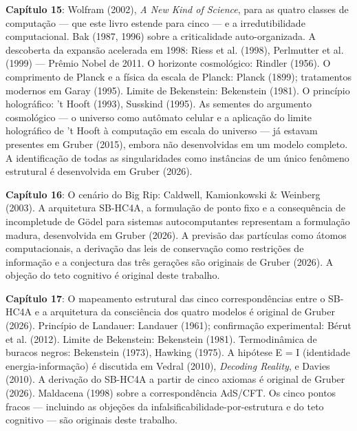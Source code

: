 \documentclass[11pt, twoside, openright]{book}
\begin{document}
\textbf{Capítulo 15}: Wolfram (2002), \textit{A New Kind of Science}, para as quatro classes de computação --- que este livro estende para cinco --- e a irredutibilidade computacional. Bak (1987, 1996) sobre a criticalidade auto-organizada. A descoberta da expansão acelerada em 1998: Riess et al. (1998), Perlmutter et al. (1999) --- Prêmio Nobel de 2011. O horizonte cosmológico: Rindler (1956). O comprimento de Planck e a física da escala de Planck: Planck (1899); tratamentos modernos em Garay (1995). Limite de Bekenstein: Bekenstein (1981). O princípio holográfico: 't Hooft (1993), Susskind (1995). As sementes do argumento cosmológico --- o universo como autômato celular e a aplicação do limite holográfico de 't Hooft à computação em escala do universo --- já estavam presentes em Gruber (2015), embora não desenvolvidas em um modelo completo. A identificação de todas as singularidades como instâncias de um único fenômeno estrutural é desenvolvida em Gruber (2026).

\textbf{Capítulo 16}: O cenário do Big Rip: Caldwell, Kamionkowski \& Weinberg (2003). A arquitetura SB-HC4A, a formulação de ponto fixo e a consequência de incompletude de Gödel para sistemas autocomputantes representam a formulação madura, desenvolvida em Gruber (2026). A previsão das partículas como átomos computacionais, a derivação das leis de conservação como restrições de informação e a conjectura das três gerações são originais de Gruber (2026). A objeção do teto cognitivo é original deste trabalho.

\textbf{Capítulo 17}: O mapeamento estrutural das cinco correspondências entre o SB-HC4A e a arquitetura da consciência dos quatro modelos é original de Gruber (2026). Princípio de Landauer: Landauer (1961); confirmação experimental: Bérut et al. (2012). Limite de Bekenstein: Bekenstein (1981). Termodinâmica de buracos negros: Bekenstein (1973), Hawking (1975). A hipótese E = I (identidade energia-informação) é discutida em Vedral (2010), \textit{Decoding Reality}, e Davies (2010). A derivação do SB-HC4A a partir de cinco axiomas é original de Gruber (2026). Maldacena (1998) sobre a correspondência AdS/\allowbreak{}CFT. Os cinco pontos fracos --- incluindo as objeções da infalsificabilidade-por-estrutura e do teto cognitivo --- são originais deste trabalho.
\end{document}
